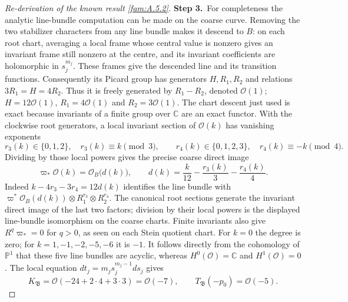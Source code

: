 \documentclass[11pt,a4paper]{article}
\theoremstyle{plain}
\theoremstyle{definition}
\begin{document}
\begin{proof}[Re-derivation of the known result \ref{fam:A.5.2}]
\par\smallskip\noindent\textbf{Step 3.}\ For completeness the analytic line-bundle computation can be made on
the coarse curve. Removing the two stabilizer characters from any line
bundle makes it descend to $B$: on each root chart, averaging a local
frame whose central value is nonzero gives an invariant frame still
nonzero at the centre, and its invariant coefficients are holomorphic
in $s_j^{m_j}$. These frames give the descended line and its transition
functions. Consequently its Picard group has
generators $H,R_1,R_2$ and relations $3R_1=H=4R_2$.
Thus it is freely generated by $R_1-R_2$, denoted $\mathcal O(1)$;
$H=12\mathcal O(1)$, $R_1=4\mathcal O(1)$ and
$R_2=3\mathcal O(1)$. The chart descent just used is exact because
invariants of a finite group over $\mathbb C$ are an exact functor.
With the clockwise root generators, a local invariant section of
$\mathcal O(k)$ has vanishing exponents
\[
 r_3(k)\in\{0,1,2\},\quad r_3(k)\equiv k\pmod3,
 \qquad
 r_4(k)\in\{0,1,2,3\},\quad r_4(k)\equiv-k\pmod4.
\]
Dividing by those local powers gives the precise coarse direct image
\begin{equation}\label{fam:eq:ab-root-degree}
 \varpi_*\mathcal O(k)=\mathcal O_B\bigl(d(k)\bigr),\qquad
 d(k)=\frac{k}{12}-\frac{r_3(k)}3-\frac{r_4(k)}4.
\end{equation}
Indeed $k-4r_3-3r_4=12d(k)$ identifies the line bundle with
$\varpi^*\mathcal O_B(d(k))\otimes R_1^{r_3}\otimes R_2^{r_4}$.
The canonical root sections generate the invariant direct image of
the last two factors; division by their local powers is the displayed
line-bundle isomorphism on the coarse charts. Finite invariants also give
$R^q\varpi_*=0$ for $q>0$, as seen on each Stein quotient chart.
For $k=0$ the degree is zero; for
$k=1,-1,-2,-5,-6$ it is $-1$. It follows directly from the
cohomology of $\mathbb P^1$ that these five line bundles are acyclic,
whereas $H^0(\mathcal O)=\mathbb C$ and $H^1(\mathcal O)=0$.
The local equation $dt_j=m_js_j^{m_j-1}ds_j$ gives
\[
 K_{\mathfrak B}=\mathcal O(-24+2\cdot4+3\cdot3)
 =\mathcal O(-7),\qquad
 T_{\mathfrak B}(-p_0)=\mathcal O(-5).
\]


\end{proof}
\end{document}
